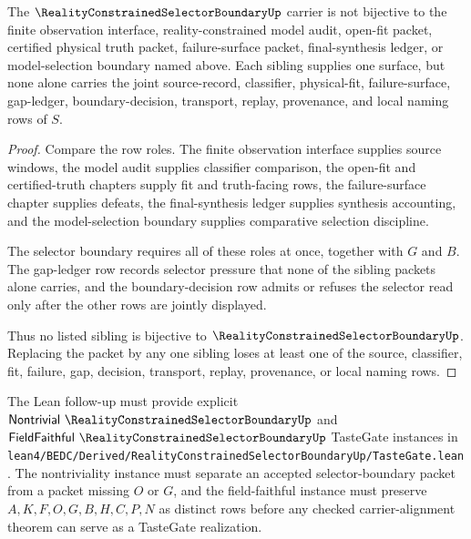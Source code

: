 \begin{theorem}
\label{thm:reality-constrained-selector-boundary-sibling-separation}
The $\RealityConstrainedSelectorBoundaryUp$ carrier is not bijective to the finite observation interface, reality-constrained model audit, open-fit packet, certified physical truth packet, failure-surface packet, final-synthesis ledger, or model-selection boundary named above. Each sibling supplies one surface, but none alone carries the joint source-record, classifier, physical-fit, failure-surface, gap-ledger, boundary-decision, transport, replay, provenance, and local naming rows of $S$.
\end{theorem}
\begin{proof}
Compare the row roles. The finite observation interface supplies source windows, the model audit supplies classifier comparison, the open-fit and certified-truth chapters supply fit and truth-facing rows, the failure-surface chapter supplies defeats, the final-synthesis ledger supplies synthesis accounting, and the model-selection boundary supplies comparative selection discipline.

The selector boundary requires all of these roles at once, together with $G$ and $B$. The gap-ledger row records selector pressure that none of the sibling packets alone carries, and the boundary-decision row admits or refuses the selector read only after the other rows are jointly displayed.

Thus no listed sibling is bijective to $\RealityConstrainedSelectorBoundaryUp$. Replacing the packet by any one sibling loses at least one of the source, classifier, fit, failure, gap, decision, transport, replay, provenance, or local naming rows.
\end{proof}



The Lean follow-up must provide explicit $\mathsf{Nontrivial}\ \RealityConstrainedSelectorBoundaryUp$ and $\mathsf{FieldFaithful}\ \RealityConstrainedSelectorBoundaryUp$ TasteGate instances in \texttt{lean4/BEDC/Derived/RealityConstrainedSelectorBoundaryUp/TasteGate.lean}. The nontriviality instance must separate an accepted selector-boundary packet from a packet missing $O$ or $G$, and the field-faithful instance must preserve $A,K,F,O,G,B,H,C,P,N$ as distinct rows before any checked carrier-alignment theorem can serve as a TasteGate realization.

